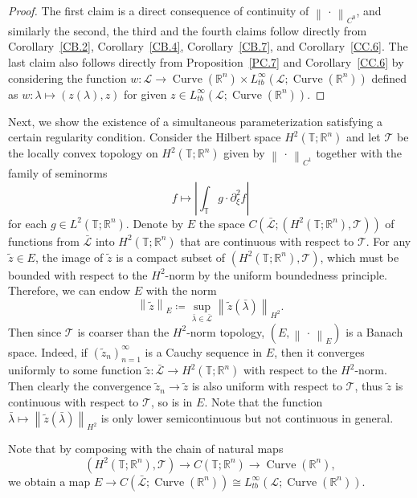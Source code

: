 \documentclass[reqno,centertags,12pt]{amsart}
\theoremstyle{definition}
\numberwithin{equation}{section}
\newcommand{\abs}[1]{\left\lvert#1\right\rvert}
\newcommand{\norm}[1]{\left\|#1\right\|}
\newcommand{\seq}[1]{\left( #1 \right)}
\newcommand{\bbR}{{\mathbb{R}}}
\newcommand{\bbT}{{\mathbb{T}}}
\begin{document}
\begin{proof}
    The first claim is a direct consequence of continuity of
    $\norm{\,\cdot\,}_{C^{0}}$, and similarly the second, the third and the fourth claims
    follow directly from Corollary~\ref{CB.2},
    Corollary~\ref{CB.4},
    Corollary~\ref{CB.7},
    and Corollary~\ref{CC.6}.
    The last claim also follows directly from
    Proposition~\ref{PC.7}
    and Corollary~\ref{CC.6}
    by considering the function $w\colon\mathcal{L}\to\operatorname{Curve}(\bbR^{n})
    \times L_{tb}^{\infty}(\mathcal{L};\operatorname{Curve}(\bbR^{n}))$
    defined as $w\colon\lambda\mapsto (z(\lambda),z)$ for given
    $z\in L_{tb}^{\infty}(\mathcal{L};\operatorname{Curve}(\bbR^{n}))$.
\end{proof}

Next, we show the existence of a simultaneous parameterization satisfying a certain
regularity condition. Consider the Hilbert space $H^{2}(\mathbb{T};\bbR^{n})$ and let
$\mathscr{T}$ be the locally convex topology on $H^{2}(\mathbb{T};\bbR^{n})$ given by
$\norm{\,\cdot\,}_{C^{1}}$ together with the family of seminorms
\[
    f\mapsto \abs{\int_{\bbT}g\cdot \partial_{\xi}^{2}f}
\]
for each $g\in L^{2}(\bbT;\bbR^{n})$.
Denote by $E$ the space $C\left(\bar{\mathcal{L}};(H^{2}(\bbT;\bbR^{n}),\mathscr{T})\right)$
of functions from $\bar{\mathcal{L}}$ into $H^{2}(\bbT;\bbR^{n})$ that are continuous
with respect to $\mathscr{T}$. For any $\tilde{z}\in E$, the image of $\tilde{z}$
is a compact subset of $(H^{2}(\bbT;\bbR^{n}),\mathscr{T})$, which must be
bounded with respect to the $H^{2}$-norm by the uniform boundedness principle.
Therefore, we can endow $E$ with the norm
\[
    \norm{\tilde{z}}_{E} \coloneqq \sup_{\bar{\lambda}\in\bar{\mathcal{L}}}
    \norm{\tilde{z}(\bar{\lambda})}_{H^{2}}.
\]
Then since $\mathscr{T}$ is coarser than the $H^{2}$-norm topology,
$(E,\norm{\,\cdot\,}_{E})$ is a Banach space. Indeed, if $\seq{\tilde{z}_{n}}_{n=1}^{\infty}$
is a Cauchy sequence in $E$, then it converges uniformly to some function
$\tilde{z}\colon\bar{\mathcal{L}}\to H^{2}(\bbT;\bbR^{n})$ with respect to the
$H^{2}$-norm. Then clearly the convergence
$\tilde{z}_{n} \to \tilde{z}$ is also uniform with respect to $\mathscr{T}$,
thus $\tilde{z}$ is continuous with respect to $\mathscr{T}$, so is in $E$.
Note that the function $\bar{\lambda} \mapsto \norm{\tilde{z}(\bar{\lambda})}_{H^{2}}$
is only lower semicontinuous but not continuous in general.

Note that by composing with the chain of natural maps
\[
    (H^{2}(\bbT;\bbR^{n}),\mathscr{T})\to C(\bbT;\bbR^{n})\to\operatorname{Curve}(\bbR^{n}),
\]
we obtain a map $E\to C(\bar{\mathcal{L}};\operatorname{Curve}(\bbR^{n}))
\cong L_{tb}^{\infty}(\mathcal{L};\operatorname{Curve}(\bbR^{n}))$.
\end{document}

